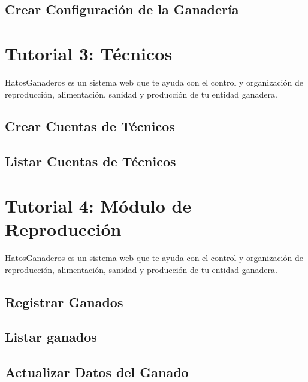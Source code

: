 \documentclass[letterpaper,10pt,english]{sphinxmanual}
\begin{document}
\subsection{Crear Configuración de la Ganadería}
\label{Tutorial 2: Configuraci_xf3n:crear-configuracion-de-la-ganaderia}

\section{Tutorial 3: Técnicos}
\label{Tutorial 3: T_xe9cnicos:tutorial-3-tecnicos}\label{Tutorial 3: T_xe9cnicos::doc}
HatosGanaderos es un sistema web que te ayuda con el control y organización de reproducción, alimentación, sanidad y producción de tu entidad ganadera.


\subsection{Crear Cuentas de Técnicos}
\label{Tutorial 3: T_xe9cnicos:crear-cuentas-de-tecnicos}

\subsection{Listar Cuentas de Técnicos}
\label{Tutorial 3: T_xe9cnicos:listar-cuentas-de-tecnicos}

\section{Tutorial 4: Módulo de Reproducción}
\label{Tutorial 4: M_xf3dulo de Reproducci_xf3n::doc}\label{Tutorial 4: M_xf3dulo de Reproducci_xf3n:tutorial-4-modulo-de-reproduccion}
HatosGanaderos es un sistema web que te ayuda con el control y organización de reproducción, alimentación, sanidad y producción de tu entidad ganadera.


\subsection{Registrar Ganados}
\label{Tutorial 4: M_xf3dulo de Reproducci_xf3n:registrar-ganados}

\subsection{Listar ganados}
\label{Tutorial 4: M_xf3dulo de Reproducci_xf3n:listar-ganados}

\subsection{Actualizar Datos del Ganado}
\label{Tutorial 4: M_xf3dulo de Reproducci_xf3n:actualizar-datos-del-ganado}
\end{document}
